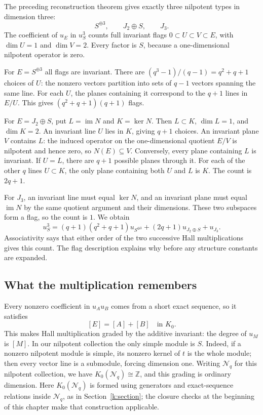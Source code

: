 \documentclass[11pt]{article}
\theoremstyle{definition}
\theoremstyle{remark}\newtheorem{remark}[theorem]{Remark}
\DeclareMathOperator{\Ker}{ker}
\DeclareMathOperator{\im}{im}
\begin{document}
The preceding reconstruction theorem gives exactly three nilpotent
types in dimension three:
\[
S^{\oplus3},\qquad J_2\oplus S,\qquad J_3.
\]
The coefficient of $u_E$ in $u_S^3$ counts full invariant flags
$0\subset U\subset V\subset E$, with $\dim U=1$ and $\dim V=2$.
Every factor is $S$, because a one-dimensional nilpotent operator is zero.

For $E=S^{\oplus3}$ all flags are invariant. There are
$(q^3-1)/(q-1)=q^2+q+1$ choices of $U$: the nonzero vectors partition
into sets of $q-1$ vectors spanning the same line. For each $U$, the
planes containing it correspond to the $q+1$ lines in $E/U$.
This gives $(q^2+q+1)(q+1)$ flags.

For $E=J_2\oplus S$, put $L=\im N$ and $K=\Ker N$. Then
$L\subset K$, $\dim L=1$, and $\dim K=2$. An invariant line $U$ lies
in $K$, giving $q+1$ choices. An invariant plane $V$ contains $L$:
the induced operator on the one-dimensional quotient $E/V$ is
nilpotent and hence zero, so $N(E)\subseteq V$. Conversely, every plane
containing $L$ is invariant. If $U=L$, there are $q+1$ possible planes
through it. For each of the other $q$ lines $U\subset K$, the only
plane containing both $U$ and $L$ is $K$. The count is $2q+1$.

For $J_3$, an invariant line must equal $\Ker N$, and an invariant
plane must equal $\im N$ by the same quotient argument and their
dimensions. These two subspaces form a flag, so the count is $1$.
We obtain
\begin{equation}\label{hall:cube}
u_S^3=(q+1)(q^2+q+1)u_{S^{\oplus3}}
       +(2q+1)u_{J_2\oplus S}+u_{J_3}.
\end{equation}
Associativity says that either order of the two successive Hall
multiplications gives this count. The flag description explains why
before any structure constants are expanded.

\subsection{What the multiplication remembers}

Every nonzero coefficient in $u_Au_B$ comes from a short exact sequence,
so it satisfies
\[
[E]=[A]+[B]\quad\text{in }K_0.
\]
This makes Hall multiplication graded by the additive invariant: the
degree of $u_M$ is $[M]$. In our nilpotent collection the only simple
module is $S$. Indeed, if a nonzero nilpotent module is simple, its
nonzero kernel of $t$ is the whole module; then every vector line is a
submodule, forcing dimension one. Writing $\mathcal N_q$ for this
nilpotent collection, we have $K_0(\mathcal N_q)\cong\mathbb Z$, and
this grading is ordinary dimension. Here $K_0(\mathcal N_q)$ is formed
using generators and exact-sequence relations inside $\mathcal N_q$,
as in Section~\ref{k:section}; the closure checks at the beginning of
this chapter make that construction applicable.
\end{document}
